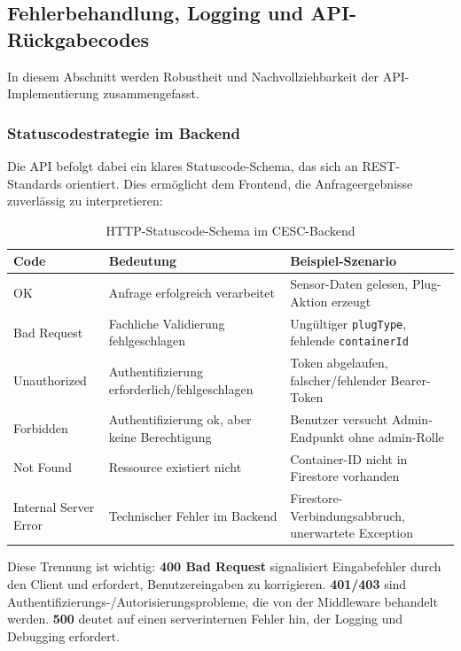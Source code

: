 \subsection{Fehlerbehandlung, Logging und API-Rückgabecodes}

In diesem Abschnitt werden Robustheit und Nachvollziehbarkeit der API-Implementierung zusammengefasst.

\subsubsection{Statuscodestrategie im Backend}

Die API befolgt dabei ein klares Statuscode-Schema, das sich an REST-Standards orientiert. Dies ermöglicht dem Frontend, die Anfrageergebnisse zuverlässig zu interpretieren:

\begin{table}[H]
    \centering
    \small
    \setlength{\tabcolsep}{5pt}
    \begin{tabularx}{\textwidth}{|>{\centering\arraybackslash}p{2.1cm}|>{\raggedright\arraybackslash}X|>{\raggedright\arraybackslash}X|}
        \hline
        \textbf{Code} & \textbf{Bedeutung} & \textbf{Beispiel-Szenario} \\
        \hline
        200 OK & Anfrage erfolgreich verarbeitet & Sensor-Daten gelesen, Plug-Aktion erzeugt \\
        \hline
        400 Bad Request & Fachliche Validierung fehlgeschlagen & Ungültiger \texttt{plugType}, fehlende \texttt{containerId} \\
        \hline
        401 Unauthorized & Authentifizierung erforderlich/fehlgeschlagen & Token abgelaufen, falscher/fehlender Bearer-Token \\
        \hline
        403 Forbidden & Authentifizierung ok, aber keine Berechtigung & Benutzer versucht Admin-Endpunkt ohne admin-Rolle \\
        \hline
        404 Not Found & Ressource existiert nicht & Container-ID nicht in Firestore vorhanden \\
        \hline
        500 Internal Server Error & Technischer Fehler im Backend & Firestore-Verbindungsabbruch, unerwartete Exception \\
        \hline
    \end{tabularx}
    \caption{HTTP-Statuscode-Schema im CESC-Backend}
    \label{tbl:backend:http-statuscodes}
\end{table}

Diese Trennung ist wichtig: \textbf{400 Bad Request} signalisiert Eingabefehler durch den Client und erfordert, Benutzereingaben zu korrigieren. \textbf{401/403} sind Authentifizierungs-/Autorisierungsprobleme, die von der Middleware behandelt werden. \textbf{500} deutet auf einen serverinternen Fehler hin, der Logging und Debugging erfordert.

